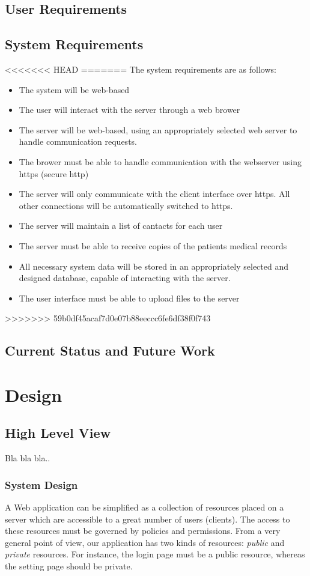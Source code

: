\documentclass[12pt]{report}
\begin{document}
\chapter{User Requirements}
\chapter{System Requirements}
<<<<<<< HEAD
=======
The system requirements are as follows:
\begin{itemize}
\item The system will be web-based
\item The user will interact with the server through a web brower
\item The server will be web-based, using an appropriately selected web server to handle communication requests.
\item The brower must be able to handle communication with the webserver using https (secure http)
\item The server will only communicate with the client interface over https.  All other connections will be automatically switched to https.
\item The server will maintain a list of cantacts for each user
\item The server must be able to receive copies of the patients medical records
\item All necessary system data will be stored in an appropriately selected and designed database, capable of interacting with the server.
\item The user interface must be able to upload files to the server
\end{itemize}

>>>>>>> 59b0df45acaf7d0e07b88eeccc6fe6df38f0f743
\chapter{Current Status and Future Work}


\part{Design}

\chapter{High Level View}
Bla bla bla..

\section{System Design}
A Web application can be simplified as a collection of resources placed on a server which are accessible to a great number of users (clients). The access to these resources must be governed by policies and permissions. From a very general point of view, our application has two kinds of resources: \emph{public} and \emph{private} resources. For instance, the login page must be a public resource, whereas the setting page should be private.
\end{document}
